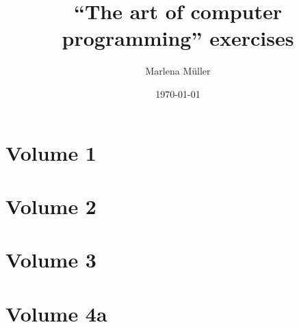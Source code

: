 \documentclass[a4paper, 12pt]{scrbook}
\begin{document}
\title{``The art of computer programming''  exercises}
\author{Marlena Müller}
\date{\today}

\maketitle
\tableofcontents
\part{Volume 1}



\part{Volume 2}


\part{Volume 3}


\part{Volume 4a}

\end{document}

